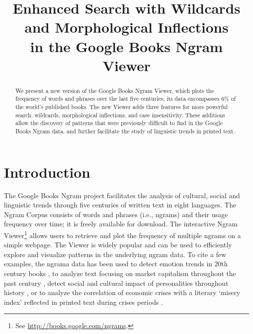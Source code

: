 \documentclass[11pt]{article}
\title{Enhanced Search with Wildcards and Morphological Inflections\\in the Google Books Ngram Viewer}
\date{}
\begin{document}
\maketitle

\begin{abstract}

We present a new version of the Google Books Ngram Viewer, which plots
the frequency of words and phrases over the last five
centuries; its data encompasses 6\% of the world's published books.
The new Viewer adds three features for more powerful search: wildcards,
morphological inflections, and case insensitivity. These additions allow
the discovery of patterns that were previously difficult to find in the Google Books Ngram data,
and further facilitate the study of linguistic trends in printed text.

\end{abstract}

\section{Introduction}

The Google Books Ngram project facilitates the analysis of cultural, social and linguistic trends through five centuries of written text in eight languages. The Ngram Corpus \cite{culturomics,lin2012syntactic} consists of words and phrases (i.e., ngrams) and their usage frequency over time; it is freely available for download. The interactive Ngram Viewer\footnote{See \url{http://books.google.com/ngrams}.} allows users to retrieve and plot the frequency of multiple ngrams on a simple webpage. The Viewer is widely popular and can be used to efficiently explore and visualize patterns in the underlying ngram data. To cite a few examples, the ngrama data has been used to detect emotion trends in 20th century books \cite{acerbi.etal.2013}, to analyze text focusing on market capitalism throughout the past century \cite{Schulz2013}, detect social and cultural impact of personalities throughout history \cite{skiena.ward.2013}, or to analyze the correlation of economic crises with a literary `misery index' reflected in printed text during crises periods \cite{bentley.et.al.2014}.
\end{document}
